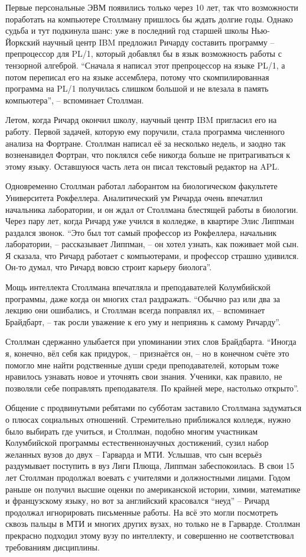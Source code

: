 Первые персональные ЭВМ появились только через 10 лет, так что возможности поработать на компьютере Столлману пришлось бы ждать долгие годы. Однако судьба и тут подкинула шанс: уже в последний год старшей школы Нью-Йоркский научный центр IBM предложил Ричарду составить программу -- препроцессор для PL/1, который добавлял бы в язык возможность работы с тензорной алгеброй. \enquote{Сначала я написал этот препроцессор на языке PL/1, а потом переписал его на языке ассемблера, потому что скомпилированная программа на PL/1 получилась слишком большой и не влезала в память компьютера}, -- вспоминает Столлман.

Летом, когда Ричард окончил школу, научный центр IBM пригласил его на работу. Первой задачей, которую ему поручили, стала программа численного анализа на Фортране. Столлман написал её за несколько недель, и заодно так возненавидел Фортран, что поклялся себе никогда больше не притрагиваться к этому языку. Оставшуюся часть лета он писал текстовый редактор на APL.

Одновременно Столлман работал лаборантом на биологическом факультете Университета Рокфеллера. Аналитический ум Ричарда очень впечатлил начальника лаборатории, и он ждал от Столлмана блестящей работы в биологии. Через пару лет, когда Ричард уже учился в колледже, в квартире Элис Липпман раздался звонок. \enquote{Это был тот самый профессор из Рокфеллера, начальник лаборатории, -- рассказывает Липпман, -- он хотел узнать, как поживает мой сын. Я сказала, что Ричард работает с компьютерами, и профессор страшно удивился. Он-то думал, что Ричард вовсю строит карьеру биолога}.

Мощь интеллекта Столлмана впечатляла и преподавателей Колумбийской программы, даже когда он многих стал раздражать. \enquote{Обычно раз или два за лекцию они ошибались, и Столлман всегда поправлял их, -- вспоминает Брайдбарт, -- так росли уважение к его уму и неприязнь к самому Ричарду}.

Столлман сдержанно улыбается при упоминании этих слов Брайдбарта. \enquote{Иногда я, конечно, вёл себя как придурок, -- признаётся он, -- но в конечном счёте это помогло мне найти родственные души среди преподавателей, которым тоже нравилось узнавать новое и уточнять свои знания. Ученики, как правило, не позволяли себе поправлять преподавателя. По крайней мере, настолько открыто}.

Общение с продвинутыми ребятами по субботам заставило Столлмана задуматься о плюсах социальных отношений. Стремительно приближался колледж, нужно было выбирать где учиться, и Столлман, подобно многим участникам Колумбийской программы естественнонаучных достижений, сузил набор желанных вузов до двух -- Гарварда и МТИ. Услышав, что сын всерьёз раздумывает поступить в вуз Лиги Плюща, Липпман забеспокоилась. В свои 15 лет Столлман продолжал воевать с учителями и должностными лицами. Годом раньше он получил высшие оценки по американской истории, химии, математике и французскому языку, но вот за английский красовался \enquote{неуд} -- Ричард продолжал игнорировать письменные работы. На всё это могли посмотреть сквозь пальцы в МТИ и многих других вузах, но только не в Гарварде. Столлман прекрасно подходил этому вузу по интеллекту, и совершенно не соответствовал требованиям дисциплины.

